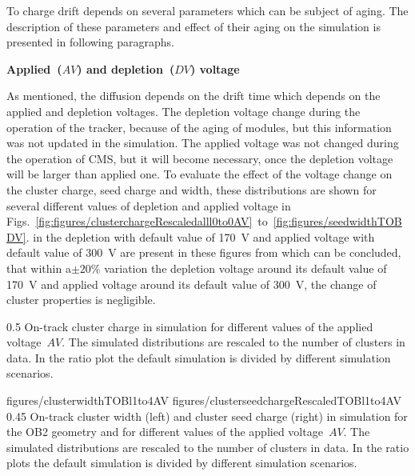 To charge drift depends on several parameters which can be subject of aging. The description of these parameters and effect of their aging on the simulation is presented in following paragraphs.

\textbf{Applied~($AV$) and depletion~($DV$) voltage}

As mentioned, the diffusion depends on the drift time which depends on the applied and depletion voltages. The depletion voltage change during the operation of the tracker, because of the aging of modules, but this information was not updated in the simulation. The applied voltage was not changed during the operation of CMS, but it will become necessary, once the depletion voltage will be larger than applied one. To evaluate the effect of the voltage change on the cluster charge, seed charge and width, these distributions are shown for several different values of depletion and applied voltage in Figs.~\ref{fig:figures/clusterchargeRescaledalll0to0AV}~to~\ref{fig:figures/seedwidthTOBDV}. in the depletion with default value of 170~V and applied voltage with default value of 300~V are present in these figures from which can be concluded, that within a$\pm 20\%$ variation the depletion voltage around its default value of 170~V and applied voltage around its default value of 300~V, the change of cluster properties is negligible.


                 {0.5}       %
                 { On-track cluster charge in simulation for different values of the applied voltage~$AV$.  The simulated distributions are rescaled to the number of clusters in data. In the ratio plot the default simulation is divided by different simulation scenarios. }

                 {figures/clusterwidthTOBl1to4AV}
                 {figures/clusterseedchargeRescaledTOBl1to4AV} %
                 {0.45}       %
                 {  On-track cluster width (left) and cluster seed charge (right) in simulation  for the OB2 geometry and for different values of the applied voltage~$AV$.  The simulated distributions are rescaled to the number of clusters in data. In the ratio plots the default simulation is divided by different simulation scenarios. }


